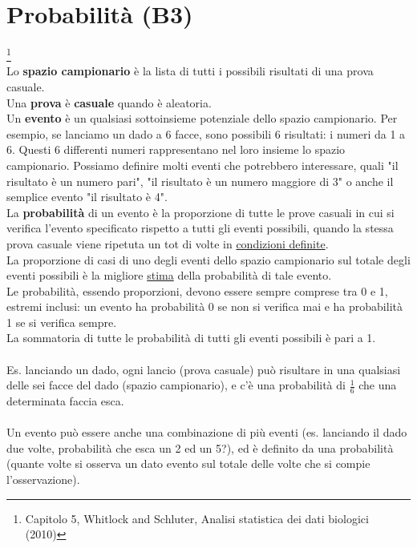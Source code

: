 \documentclass[10pt, draft]{book}
\begin{document}
\chapter{Probabilità (B3)}\footnote{Capitolo 5, Whitlock and Schluter, Analisi statistica dei dati biologici (2010)}
\\
Lo \textbf{spazio campionario} è la lista di tutti i possibili risultati di una prova casuale.
\\
Una \textbf{prova} è \textbf{casuale} quando è aleatoria.
\\
Un \textbf{evento} è un qualsiasi sottoinsieme potenziale dello spazio campionario. Per esempio, se lanciamo un dado a 6 facce, sono possibili 6 risultati: i numeri da 1 a 6. Questi 6 differenti numeri rappresentano nel loro insieme lo spazio campionario. Possiamo definire molti eventi che potrebbero interessare, quali "il risultato è un numero pari", "il risultato è un numero maggiore di 3" o anche il semplice evento "il risultato è 4". 
\\
La \textbf{probabilità} di un evento è la proporzione di tutte le prove casuali in cui si verifica l'evento specificato rispetto a tutti gli eventi possibili, quando la stessa prova casuale viene ripetuta un tot di volte in \underline{condizioni definite}.
\\
La proporzione di casi di uno degli eventi dello spazio campionario sul totale degli eventi possibili è la migliore \underline{stima} della probabilità di tale evento.
\\
Le probabilità, essendo proporzioni, devono essere sempre comprese tra 0 e 1, estremi inclusi: un evento ha probabilità 0 se non si verifica mai e ha probabilità 1 se si verifica sempre.
\\
La sommatoria di tutte le probabilità di tutti gli eventi possibili è pari a 1.
\\
\\
Es. lanciando un dado, ogni lancio (prova casuale) può risultare in una qualsiasi delle sei facce del dado (spazio campionario), e c’è una probabilità di $\frac{1}{6}$ che una determinata faccia esca.
\\
\\
Un evento può essere anche una combinazione di più eventi (es. lanciando il dado due volte, probabilità che esca un 2 ed un 5?), ed è definito da una probabilità (quante volte si osserva un dato evento sul totale delle volte che si compie l’osservazione).
\end{document}
